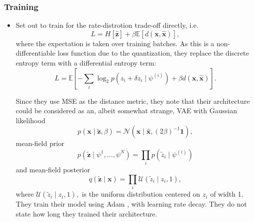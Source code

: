\documentclass{article}
\renewcommand{\vec}[1]{\mathbf{#1}}
\newcommand{\Exp}{\mathbb{E}}
\newcommand{\Norm}[1]{\mathcal{N}\left( #1 \right)}
\newcommand{\Unif}[1]{\mathcal{U}\left( #1 \right)}
\begin{document}
\subsubsection{Training}
\par
\begin{itemize}
\item \cite{balle2016end} Set out to train for the rate-distrotion trade-off
  directly, i.e.
  \[
    L = H[\vec{\hat{z}}] + \beta \Exp[d(\vec{x}, \vec{\hat{x}})],
  \]
  where the expectation is taken over training batches.
  As this is a non-differentiable loss function due to the quantization, they
  replace the discrete entropy term with a differential entropy term:
  \[
   L = \Exp\left[ -\sum_i \log_2 p(z_i + \delta z_i \mid \psi^{(i)}) +
                     \beta d(\vec{x}, \vec{\hat{x}})\right].
  \]
  \par Since they use MSE as the distance metric, they note that their
  architecture could be considered as an, albeit somewhat
  strange, VAE with Gaussian likelihood
  \[
    p(\vec{x} \mid \vec{\tilde{z}}, \beta) =
    \Norm{\vec{x} \mid \vec{\hat{x}}, (2\beta)^{-1}\vec{1}},
  \]
  mean-field prior
  \[
    p(\vec{\tilde{z}} \mid \psi^{1}, \hdots, \psi^{N}) =
    \prod_i p(\tilde{z}_i \mid \psi^{(i)})
  \]
  and mean-field posterior
  \[
    q(\vec{\tilde{z}} \mid \vec{x}) =
    \prod_i \Unif{\tilde{z}_i \mid z_i, 1},
  \]
  where $\Unif{\tilde{z}_i \mid z_i, 1},$ is the uniform distribution centered
  on $z_i$ of width 1. They train their model using Adam \cite{kingma2014adam},
  with learning rate decay. They do not state how long they trained their
  architecture.
  

\end{itemize}
\end{document}
